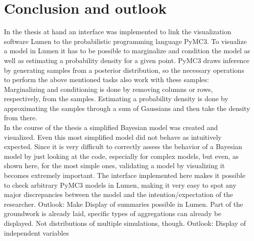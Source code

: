 \documentclass{article}
\begin{document}
\section {Conclusion and outlook}
In the thesis at hand an interface was implemented to link the visualization software Lumen to the probabilistic programming language PyMC3. To visualize a model in Lumen it has to be possible to marginalize and condition the model as well as estimating a probability density for a given point. PyMC3 draws inference by generating samples from a posterior distribution, so the necessary operations to perform the above mentioned tasks also work with these samples: Marginalizing and conditioning is done by removing columns or rows, respectively, from the samples. Estimating a probability density is done by approximating the samples through a sum of Gaussians and then take the density from there.\\
In the course of the thesis a simplified Bayesian model was created and visualized. Even this most simplified model did not behave as intuitively expected. Since it is very difficult to correctly assess the behavior of a Bayesian model by just looking at the code, especially for complex models, but even, as shown here, for the most simple ones, validating a model by visualizing it becomes extremely important. The interface implemented here makes it possible to check arbitrary PyMC3 models in Lumen, making it very easy to spot any major discrepancies between the model and the intention/expectation of the researcher.
Outlook: Make Display of summaries possible in Lumen. Part of the groundwork is already laid, specific types of aggregations can already be displayed. Not distributions of multiple simulations, though.
Outlook: Display of independent variables

\pagebreak
\listoffigures
\pagebreak
\lstlistoflistings

\pagebreak        


\end{document}

